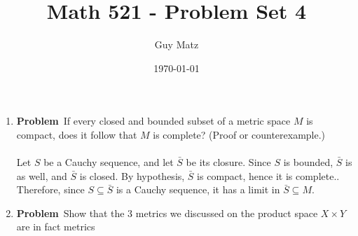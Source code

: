 \documentclass[12pt]{amsart}
\title{\textbf{Math 521 - Problem Set 4}}
\author{Guy Matz}
\date{\today}
\theoremstyle{definition}
\newcommand{\itep}{\item {\bfseries Problem}\ }
\begin{document}
 

\maketitle
\newpage %

\begin{enumerate}[series=p]
\itep  If every closed and bounded subset of a metric space $M$ is compact, does it follow that $M$ is complete? (Proof or counterexample.)
\\\\
Let $S$ be a Cauchy sequence, and let $\bar{S}$ be its closure.  Since $S$ is bounded, $\bar{S}$ is as well, and $\bar{S}$ is closed.  By hypothesis, $\bar{S}$ is compact, hence it is complete..  Therefore, since $S \subseteq \bar{S}$ is a Cauchy sequence, it has a limit in $\bar{S} \subseteq M$.


\newpage

\itep Show that the 3 metrics we discussed on the product space $X \times Y$ are in fact metrics


\end{enumerate}
\end{document}
